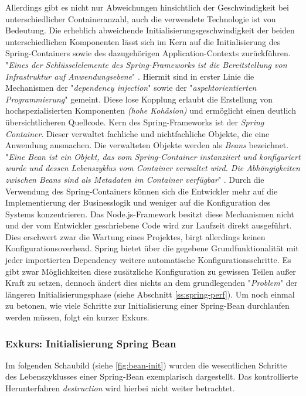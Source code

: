 Allerdings gibt es nicht nur Abweichungen hinsichtlich der Geschwindigkeit bei unterschiedlicher Containeranzahl, auch die verwendete Technologie ist von Bedeutung. Die erheblich abweichende Initialisierungsgeschwindigkeit der beiden unterschiedlichen Komponenten lässt sich im Kern auf die Initialisierung des Spring-Containers sowie des dazugehörigen Application-Contexts zurückführen. "\emph{Eines der Schlüsselelemente des Spring-Frameworks ist die Bereitstellung von Infrastruktur auf Anwendungsebene}" \cite[Seite~53 ff.]{simons-spring}. Hiermit sind in erster Linie die Mechanismen der "\emph{dependency injection}" sowie der "\emph{aspektorientierten Programmierung}" gemeint. Diese lose Kopplung erlaubt die Erstellung von hochspezialisierten Komponenten \emph{(hohe Kohäsion)} und ermöglicht einen deutlich übersichtlicheren Quellcode. Kern des Spring-Frameworks ist der \emph{Spring Container}. Dieser verwaltet fachliche und nichtfachliche Objekte, die eine Anwendung ausmachen. Die verwalteten Objekte werden als \emph{Beans} bezeichnet. "\emph{Eine Bean ist ein Objekt, das vom Spring-Container instanziiert und konfiguriert wurde und dessen Lebenszyklus vom Container verwaltet wird. Die Abhängigkeiten zwischen Beans sind als Metadaten im Container verfügbar}" \cite[Kapitel~3.1.1]{simons-spring}. Durch die Verwendung des Spring-Containers können sich die Entwickler mehr auf die Implementierung der Businesslogik und weniger auf die Konfiguration des Systems konzentrieren. Das Node.js-Framework besitzt diese Mechanismen nicht und der vom Entwickler geschriebene Code wird zur Laufzeit direkt ausgeführt. Dies erschwert zwar die Wartung eines Projektes, birgt allerdings keinen Konfigurationsoverhead. Spring bietet über die gegebene Grundfunktionalität mit jeder importierten Dependency weitere automatische Konfigurationsschritte. Es gibt zwar Möglichkeiten diese zusätzliche Konfiguration zu gewissen Teilen außer Kraft zu setzen, dennoch ändert dies nichts an dem grundlegenden "\emph{Problem}" der längeren Initialisierungsphase (siehe Abschnitt \ref{ss:spring-perf}). Um noch einmal zu betonen, wie viele Schritte zur Initialisierung einer Spring-Bean durchlaufen werden müssen, folgt ein kurzer Exkurs.

\subsubsection{Exkurs: Initialisierung Spring Bean}
Im folgenden Schaubild (siehe \ref{fig:bean-init}) wurden die wesentlichen Schritte des Lebenszyklusses einer Spring-Bean exemplarisch dargestellt. Das kontrollierte Herunterfahren \emph{destruction} wird hierbei nicht weiter betrachtet. 

